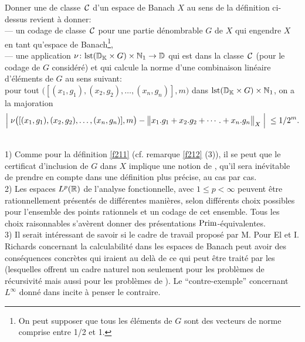 \begin{fproposition} \label{f262}
Donner une \rp  de classe~${{\cal C}}$   d'un espace de Banach $X$ au sens de la 
définition ci-dessus revient à donner: \\
--- un codage de classe~${{\cal C}}$   pour  une partie dénombrable $G$ de $X$ qui 
engendre $X$ en tant qu'espace de Banach{\footnote{On peut supposer que tous les éléments de $G$ sont des vecteurs de norme comprise entre 1/2 et 1.}},\\    
--- une application   $\nu \colon  {\rm lst}(\mathbb {D}_{\mathbb {K}} \times G) \times \mathbb {N}_1 
\rightarrow
 \mathbb {D}$  qui est dans la classe~${{\cal C}}$   (pour le codage de $G$ considéré)  et 
qui calcule la norme d'une combinaison linéaire d'éléments de  $G$  au sens suivant:\\   	
pour tout $\big([(x_1,g_1),(x_2,g_2),\ldots,(x_n,g_n)],m\big)$ dans  ${\rm lst}(\mathbb {D}_{\mathbb {K}} \times G) \times \mathbb {N}_1$, on a la majoration
\[
\Big|{\;\nu\big([(x_1,g_1),(x_2,g_2),\ldots,(x_n,g_n)],m\big) - \big\lVert  x_1.g_1 + x_2.g_2 +\cdots.+ x_n.g_n  \big\rVert_X \; }\Big|\; \leq 1/2^m.
\]
\end{fproposition}

\begin{fremarks} \label{f263}~\\
1)	Comme pour la définition \ref{f211}  (cf. remarque \ref{f212} (3)), il se 
peut que le certificat d'inclusion de $G$ dans $X$ implique une notion de 
\com, qu'il sera inévitable de prendre en compte dans une définition plus 
précise, au cas par cas.\\
2)	Les espaces  $L^p(\mathbb {R})$  de l'analyse fonctionnelle, avec  $1 \leq p < 
\infty$  peuvent être rationnellement présentés de différentes 
manières, selon différents choix possibles pour l'ensemble des points 
rationnels et un codage de cet ensemble. Tous les choix raisonnables 
s'avèrent donner des présentations  ${\rm Prim}$-équivalentes. \\
3)	Il serait intéressant de savoir si le cadre de travail proposé par M. 
Pour El et I. Richards \cite{fPR} concernant la calculabilité dans les espaces 
de Banach peut avoir des conséquences concrètes qui iraient au delà de ce 
qui peut être traité par les \rps  (lesquelles offrent un cadre naturel non seulement pour les problèmes de récursivité mais aussi pour les 
problèmes de \comz). Le ``contre-exemple'' concernant  $L^{\infty}$  donné 
dans \cite{fPR} incite à penser le contraire. 
\end{fremarks}

